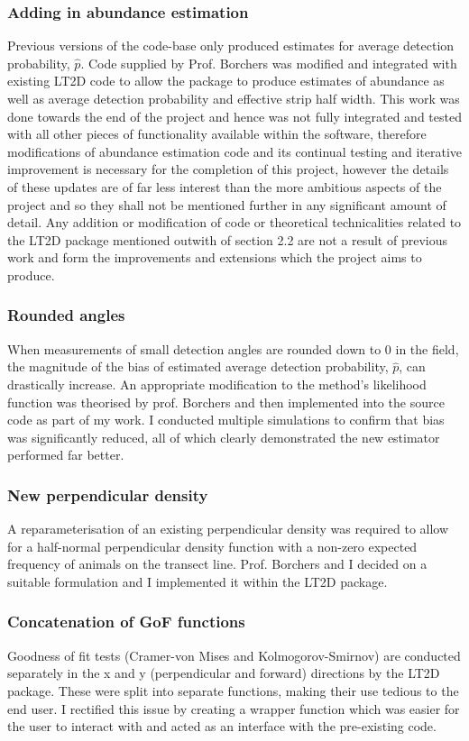 \documentclass[11pt]{article}
\begin{document}
\begin{multicols}{2}
\subsubsection{Adding in abundance estimation}
Previous versions of the code-base only produced estimates for average detection probability, $\hat{p}$. Code supplied by Prof. Borchers was modified and integrated with existing LT2D code to allow the package to produce estimates of abundance as well as average detection probability and effective strip half width. This work was done towards the end of the project and hence was not fully integrated and tested with all other pieces of functionality available within the software, therefore modifications of abundance estimation code and its continual testing and iterative improvement is necessary for the completion of this project, however the details of these updates are of far less interest than the more ambitious aspects of the project and so they shall not be mentioned further in any significant amount of detail. Any addition or modification of code or theoretical technicalities related to the LT2D package mentioned outwith of section 2.2 are not a result of previous work and form the improvements and extensions which the project aims to produce.

\subsubsection{Rounded angles}
When measurements of small detection angles are rounded down to $0$ in the field, the magnitude of the bias of estimated average detection probability, $\hat{p}$, can drastically increase. An appropriate modification to the method's likelihood function was theorised by prof. Borchers and then implemented into the source code as part of my work. I conducted multiple simulations to confirm that bias was significantly reduced, all of which clearly demonstrated the new estimator performed far better.

\subsubsection{New perpendicular density}
A reparameterisation of an existing perpendicular density was required to allow for a  half-normal perpendicular density function with a non-zero expected frequency of animals on the transect line. Prof. Borchers and I decided on a suitable formulation and I implemented it within the LT2D package. 

\subsubsection{Concatenation of GoF functions}
Goodness of fit tests (Cramer-von Mises and Kolmogorov-Smirnov) are conducted separately in the x and y (perpendicular and forward) directions by the LT2D package. These were split into separate functions, making their use tedious to the end user. I rectified this issue by creating a wrapper function which was easier for the user to interact with and acted as an interface with the pre-existing code.


\end{multicols}
\end{document}
